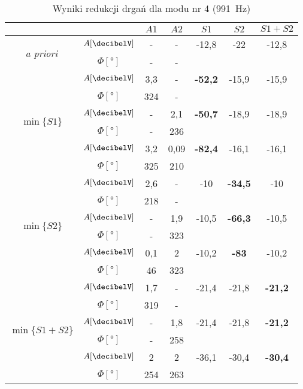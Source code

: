 \documentclass[polish,a4paper,11pt]{mwart}
\begin{document}
  \begin{table}[!tbh]
    \centering
    \caption{Wyniki redukcji drgań dla modu nr 4 (\SI{991}{\hertz})}
    \label{tab:red4}
    \begin{tabular}{|c|c|c|c|c|c|c|}
      \cline{3-7}
      \multicolumn{2}{c|}{}&$A1$&$A2$&$S1$&$S2$&$S1+S2$\\\hline
      \multirow{2}{*}{\textit{a priori}} & $A [\si{\decibelV}]$ & - & - & -12,8 & -22 & -12,8\\\cline{2-7}
					 & $\Phi [\si{\degree}]$ & - & - & \multicolumn{3}{c}{}\\\hline
      \multirow{6}{*}{$\min\{S1\}$}   &   $A [\si{\decibelV}]$ & 3,3 & - & \textbf{-52,2} & -15,9 & -15,9\\\cline{2-7}
				      &$\Phi [\si{\degree}]$ & 324 & - & \multicolumn{3}{c}{}\\\cline{2-7}
				      &   $A [\si{\decibelV}]$ & - & 2,1 & \textbf{-50,7} & -18,9 & -18,9\\\cline{2-7}
				      &$\Phi [\si{\degree}]$ & - & 236 & \multicolumn{3}{c}{}\\\cline{2-7}
				      &   $A [\si{\decibelV}]$ & 3,2 & 0,09 & \textbf{-82,4} & -16,1 & -16,1\\\cline{2-7}
				      &$\Phi [\si{\degree}]$ & 325 & 210 & \multicolumn{3}{c}{}\\\hline
      \multirow{6}{*}{$\min\{S2\}$}   &   $A [\si{\decibelV}]$ & 2,6 & - & -10 & \textbf{-34,5} & -10\\\cline{2-7}
				      &$\Phi [\si{\degree}]$ & 218 & - & \multicolumn{3}{c}{}\\\cline{2-7}
				      &   $A [\si{\decibelV}]$ & - & 1,9 & -10,5 & \textbf{-66,3} & -10,5\\\cline{2-7}
				      &$\Phi [\si{\degree}]$ & - & 323 & \multicolumn{3}{c}{}\\\cline{2-7}
				      &   $A [\si{\decibelV}]$ & 0,1 & 2 & -10,2 & \textbf{-83} & -10,2\\\cline{2-7}
				      &$\Phi [\si{\degree}]$ & 46 & 323 & \multicolumn{3}{c}{}\\\hline
      \multirow{6}{*}{$\min\{S1+S2\}$}&   $A [\si{\decibelV}]$ & 1,7 & - & -21,4 & -21,8 & \textbf{-21,2} \\\cline{2-7}
				      &$\Phi [\si{\degree}]$ & 319 & - & \multicolumn{3}{c}{}\\\cline{2-7}
				      &   $A [\si{\decibelV}]$ & - & 1,8 & -21,4 & -21,8 & \textbf{-21,2} \\\cline{2-7}
				      &$\Phi [\si{\degree}]$ & - & 258 & \multicolumn{3}{c}{}\\\cline{2-7}
				      &   $A [\si{\decibelV}]$ & 2 & 2 & -36,1 & -30,4 & \textbf{-30,4} \\\cline{2-7}
				      &$\Phi [\si{\degree}]$ & 254 & 263 & \multicolumn{3}{c}{}\\\cline{1-4}
    \end{tabular}
  \end{table}
\end{document}
